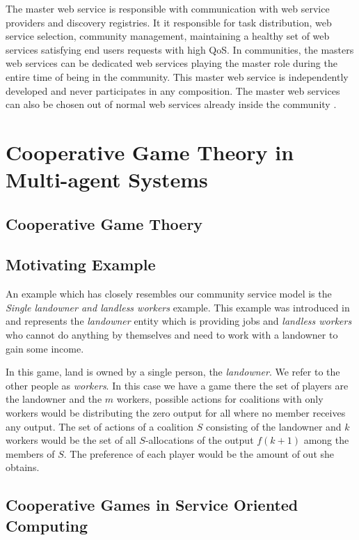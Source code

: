         The master web service is responsible with communication with web service providers and discovery registries. It it responsible for task distribution, web service selection,
        community management, maintaining a healthy set of web services satisfying end users requests with high QoS. In communities, the masters web services can be
        dedicated web services playing the master role during the entire time of being in the community. This master web service is independently developed and never
        participates in any composition. The master web services can also be chosen out of normal web services already inside the community \cite{DBLP:journals/ijebr/MaamarSTBB09}.


    \section{Cooperative Game Theory in Multi-agent Systems}\label{sec:CGTMS}

        \subsection{Cooperative Game Thoery}\label{sec:BRWS}

        \subsection{Motivating Example}\label{sec:CWSDefinition}

        An example which has closely resembles our community service model is the \emph{Single landowner and landless workers} example.
        This example was introduced in \cite{GVK369342747} and represents the \emph{landowner} entity which is providing jobs and \emph{landless workers} who cannot do anything by themselves and need to work with a landowner to gain some income.

        In this game, land is owned by a single person, the \emph{landowner}. We refer to the other people as \emph{workers}. In this case we have a game there the set of players are the landowner and the $m$ workers, possible actions for coalitions with only workers would be distributing the zero output for all where no member receives any output. The set of actions of a coalition $S$ consisting of the landowner and $k$ workers would be the set of all $S$-allocations of the output $f(k+1)$ among the members of $S$. The preference of each player would be the amount of out she obtains.

        \subsection{Cooperative Games in Service Oriented Computing}\label{sec:CWSArchitecture}

